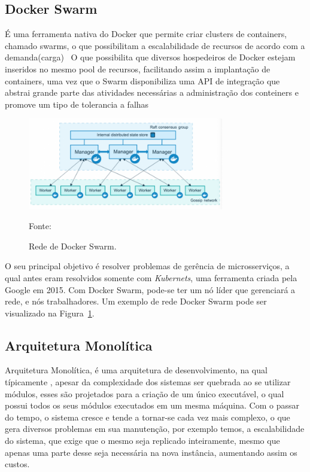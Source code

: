 \subsection{Docker Swarm}

É uma ferramenta nativa do Docker que permite criar clusters de containers, chamado swarms, o que possibilitam a escalabilidade de recursos de acordo com a demanda(carga)~\cite{turnbullMarc17}
O que possibilita que diversos hospedeiros de Docker estejam inseridos no mesmo pool de recursos, facilitando assim a implantação de containers, uma vez que o Swarm disponibiliza uma API de integração que abstrai grande parte das
atividades necessárias a administração dos conteiners e promove um tipo de tolerancia a falhas


\begin{figure}[htb!]
\caption{Rede de Docker Swarm.}
\label{fig:docker_swarm}
\includegraphics[height=4cm]{img/cap2/docker_swarm.png}
\centering

Fonte:~\cite{container}
\end{figure}


O seu principal objetivo é resolver problemas de gerência de microsserviços, a qual antes eram resolvidos somente com \textit{Kubernets}, uma ferramenta criada pela Google em 2015.
%
Com Docker Swarm, pode-se ter um nó líder que gerenciará a rede, e nós trabalhadores.
%
Um exemplo de rede Docker Swarm pode ser visualizado na Figura~\ref{fig:docker_swarm}.


\subsection{Arquitetura Monolítica}

Arquitetura Monolítica, é uma arquitetura de desenvolvimento, na qual típicamente , apesar da complexidade dos sistemas ser quebrada ao se utilizar módulos, esses são projetados para a criação de um único executável, o qual possui todos os seus módulos executados em um mesma máquina.
Com o passar do tempo, o sistema cresce e tende a tornar-se cada vez mais complexo, o que gera diversos problemas em sua manutenção, por exemplo temos, a escalabilidade do sistema, que exige que o mesmo seja replicado inteiramente, mesmo que apenas uma parte desse seja necessária na nova instância, aumentando assim os custos.

